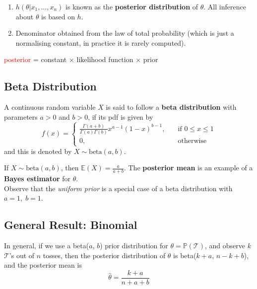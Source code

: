 \documentclass{article}
\begin{document}
\begin{enumerate}
    \item $h(\theta | x_{1}, \dots , x_n)$ is known as the \textbf{posterior distribution} of $\theta$. All inference about $\theta$ is based on $h$. 
    \item Denominator obtained from the law of total probability (which is just a normalising constant, in practice it is rarely computed). 
\end{enumerate}

\begin{definition}
    \textcolor{red}{posterior} = \textcolor{Apricot}{constant} $\times$ likelihood function $\times$ prior
\end{definition}

\subsection{Beta Distribution}

\begin{definition}
    A continuous random variable $X$ is said to follow a \textbf{beta distribution} with parameters $a > 0$ and $b > 0$, if its pdf is given by \begin{equation*}
        f(x) = \begin{cases}
            \frac{\Gamma (a + b)}{\Gamma (a) \Gamma (b)} x^{a-1} (1-x)^{b-1}, \quad & \text{if } 0 \leq x \leq 1 \\ 
            0, \quad & \text{otherwise}
        \end{cases}
    \end{equation*} and this is denoted by $X \sim \text{beta} (a,b)$. 
\end{definition}

\noindent If $X \sim \text{beta}(a,b)$, then $ \mathbb{E}(X) = \frac{a}{a+b}$. The \textbf{posterior mean} is an example of a \textbf{Bayes estimator} for $\theta$. \\ 

\noindent Observe that the \textit{uniform prior} is a special case of a beta distribution with $a = 1, \; b = 1$. 

\subsection{General Result: Binomial}

\begin{theorem}
    In general, if we use a beta($a$, $b$) prior distribution for $\theta = \mathbb{P}(\mathcal{T})$, and observe $k$ $\mathcal{T}$'s out of $n$ tosses, then the posterior distribution of $\theta$ is beta($k+a$, $n-k+b$), and the posterior mean is \begin{equation*}
        \hat{\theta} = \frac{k + a }{n + a + b}
    \end{equation*}
\end{theorem}
\end{document}

